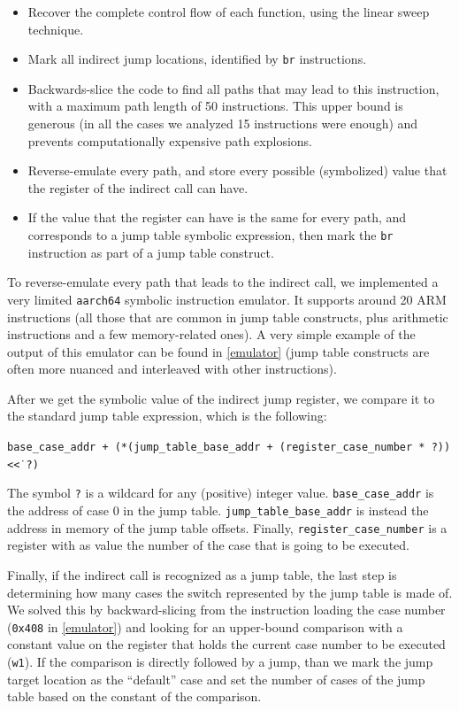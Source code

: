 \documentclass[a4paper,11pt,oneside]{report}
\begin{document}
\begin{itemize}
	\item Recover the complete control flow of each function, using the linear sweep technique.
	\item Mark all indirect jump locations, identified by \texttt{br} instructions.
	\item Backwards-slice the code to find all paths that may lead to
		this instruction, with a maximum path length of 50 instructions. This upper bound is generous (in all the cases we analyzed 15 instructions were enough) and prevents computationally expensive path explosions.
	\item Reverse-emulate every path, and store every possible (symbolized)
		value that the register of the indirect call can have.
	\item If the value that the register can have is the same for every path,
		and corresponds to a jump table symbolic expression, then mark the
		\texttt{br} instruction as part of a jump table construct.
\end{itemize}

To reverse-emulate every path that leads to the indirect call, we implemented a
very limited \texttt{aarch64} symbolic instruction emulator. It supports around
20 ARM instructions (all those that are common in jump table constructs, plus
arithmetic instructions and a few memory-related ones).  A very simple example of the
output of this emulator can be found in \autoref{emulator} (jump table constructs are 
often more nuanced and interleaved with other instructions).

After we get the symbolic value of the indirect jump register, we compare it to
the standard jump table expression, which is the following:

\texttt{base\_case\_addr + (*(jump\_table\_base\_addr + (register\_case\_number * ?)) \textless\.\textless\  ?)} 

The symbol \texttt{?} is a wildcard for any (positive) integer value.
\texttt{base\_case\_addr} is the address of case 0 in the jump table.
\texttt{jump\_table\_base\_addr} is instead the address in memory of the jump
table offsets. Finally, \texttt{register\_case\_number} is a register with as
value the number of the case that is going to be executed. 

Finally, if the indirect call is recognized as a jump table, the last step is
determining how many cases the switch represented by the jump table is made of.
We solved this by backward-slicing from the instruction loading the case number
(\texttt{0x408} in \autoref{emulator}) and looking for an upper-bound
comparison with a constant value on the register that holds the current case
number to be executed (\texttt{w1}).  If the comparison is directly followed by
a jump, than we mark the jump target location as the ``default'' case and set
the number of cases of the jump table based on the constant of the comparison.
\end{document}
